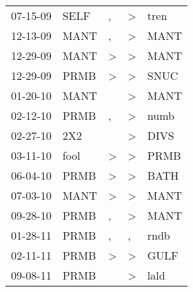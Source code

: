 \begin{supertabular}{p{0.07\textwidth}p{0.06\textwidth}p{0.02\textwidth}p{0.02\textwidth}p{0.06\textwidth}}
 07-15-09\textsuperscript{} &           SELF\textsuperscript{} &                , &  \textgreater &           tren\textsuperscript{} \\
 12-13-09\textsuperscript{} &           MANT\textsuperscript{} &                , &  \textgreater &           MANT\textsuperscript{} \\
 12-29-09\textsuperscript{} &           MANT\textsuperscript{} &     \textgreater &  \textgreater &           MANT\textsuperscript{} \\
 12-29-09\textsuperscript{} &           PRMB\textsuperscript{} &     \textgreater &  \textgreater &           SNUC\textsuperscript{} \\
 01-20-10\textsuperscript{} &           MANT\textsuperscript{} &                  &  \textgreater &           MANT\textsuperscript{} \\
 02-12-10\textsuperscript{} &           PRMB\textsuperscript{} &                , &  \textgreater &           numb\textsuperscript{} \\
 02-27-10\textsuperscript{} &            2X2\textsuperscript{} &                  &  \textgreater &           DIVS\textsuperscript{} \\
 03-11-10\textsuperscript{} &           fool\textsuperscript{} &     \textgreater &  \textgreater &           PRMB\textsuperscript{} \\
 06-04-10\textsuperscript{} &           PRMB\textsuperscript{} &     \textgreater &  \textgreater &           BATH\textsuperscript{} \\
 07-03-10\textsuperscript{} &           MANT\textsuperscript{} &     \textgreater &  \textgreater &           MANT\textsuperscript{} \\
 09-28-10\textsuperscript{} &           PRMB\textsuperscript{} &                , &  \textgreater &           MANT\textsuperscript{} \\
 01-28-11\textsuperscript{} &           PRMB\textsuperscript{} &                , &             , &           rndb\textsuperscript{} \\
 02-11-11\textsuperscript{} &           PRMB\textsuperscript{} &     \textgreater &  \textgreater &           GULF\textsuperscript{} \\
 09-08-11\textsuperscript{} &           PRMB\textsuperscript{} &                  &  \textgreater &           lald\textsuperscript{} \\

\end{supertabular}
